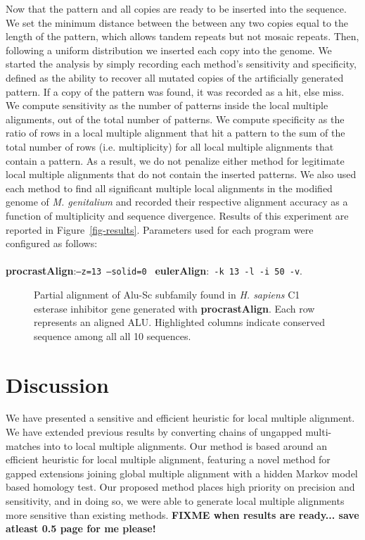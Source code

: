 \documentclass{ws-procs975x65}
\begin{document}
Now that the pattern and all copies are ready to be inserted into the sequence. We set the minimum distance between the between any two copies equal to the length of the pattern, which allows tandem repeats but not mosaic repeats. Then, following a uniform distribution we inserted each copy into the genome.  We started the analysis by simply recording each method's sensitivity and specificity, defined as the ability to recover all mutated copies of the  artificially generated pattern. If a copy of the pattern was found, it was recorded as a hit, else miss. We compute sensitivity as the number of patterns inside the local multiple alignments, out of the total number of patterns.  We compute specificity as the ratio of rows in a local multiple alignment that hit a pattern to the sum of the total number of rows (i.e. multiplicity) for all local multiple alignments that contain a pattern.  As a result, we do not penalize either method for legitimate local multiple alignments that do not contain the inserted patterns. We also used each method to find all significant multiple local alignments in the modified genome of \emph{M. genitalium} and recorded their respective alignment accuracy as a function of multiplicity and sequence divergence. Results of this experiment are reported in Figure~\ref{fig-results}. Parameters used for each program were configured as follows: \\ \\ \textbf{procrastAlign}:\texttt{--z=13 --solid=0 } \textbf{eulerAlign}:\texttt{ -k 13 -l -i 50 -v}.


\begin{figure}[t]
\centering {}
\caption{Partial alignment of Alu-Sc subfamily found in \emph{H. sapiens} C1 esterase inhibitor gene generated with \textbf{procrastAlign}. Each row represents an aligned ALU. Highlighted columns indicate conserved sequence among all all 10 sequences.}
\label{fig-align}
\end{figure}

\section{Discussion}

We have presented a sensitive and efficient heuristic for local multiple alignment. We have extended previous results by converting chains of ungapped multi-matches into to local multiple alignments. Our method is based around an efficient heuristic for local multiple alignment, featuring a novel method for gapped extensions joining global multiple alignment with a hidden Markov model based homology test. Our proposed method places high priority on precision and sensitivity, and in doing so, we were able to generate local multiple alignments more sensitive than existing methods. \textbf{FIXME when results are ready... save atleast 0.5 page for me please!}
\end{document}
